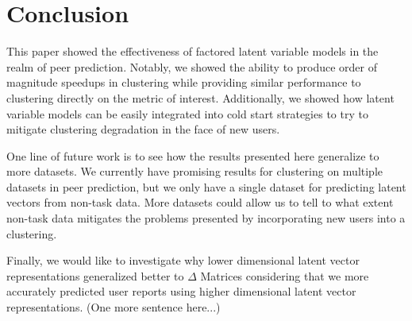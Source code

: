 \documentclass{article}
\begin{document}
\section{Conclusion}

This paper showed the effectiveness of factored latent variable models in the realm of peer prediction. Notably, we showed the ability to produce order of magnitude speedups in clustering while providing similar performance to clustering directly on the metric of interest. Additionally, we showed how latent variable models can be easily integrated into cold start strategies to try to mitigate clustering degradation in the face of new users. 

One line of future work is to see how the results presented here generalize to more datasets. We currently have promising results for clustering on multiple datasets in peer prediction, but we only have a single dataset for predicting latent vectors from non-task data. More datasets could allow us to tell to what extent non-task data mitigates the problems presented by incorporating new users into a clustering. 

Finally, we would like to investigate why lower dimensional latent vector representations generalized better to $\Delta$ Matrices considering that we more accurately predicted user reports using higher dimensional latent vector representations. (One more sentence here...)







\end{document}
